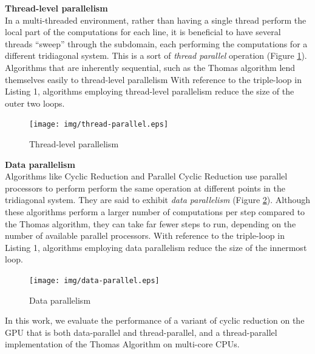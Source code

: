 \documentclass{article}
\begin{document}
    \pagebreak

    \textbf{Thread-level parallelism} \\
        In a multi-threaded environment,
        rather than having a single thread perform the local part
        of the computations for each line,
        it is beneficial to have several threads ``sweep'' through the subdomain,
        each performing the computations for a different tridiagonal system.
        This is a sort of \emph{thread parallel} operation (Figure \ref{fig:thread-parallel}).
        Algorithms that are inherently sequential,
        such as the Thomas algorithm lend themselves easily to thread-level parallelism
        With reference to the triple-loop in Listing 1,
        algorithms employing thread-level parallelism reduce the
        size of the outer two loops.

        \begin{figure}[h]
        \begin{center}
        \texttt{[image: img/thread-parallel.eps]}
        \end{center}
        \caption{Thread-level parallelism}
        \label{fig:thread-parallel}
        \end{figure}

    \textbf{Data parallelism} \\
        Algorithms like Cyclic Reduction and Parallel Cyclic Reduction
        use parallel processors to perform
        perform the same operation at different points in the tridiagonal system.
        They are said to exhibit \emph{data parallelism} (Figure \ref{fig:data-parallel}).
        Although these algorithms perform a larger number of computations
        per step compared to the Thomas algorithm,
        they can take far fewer steps to run,
        depending on the number of available parallel processors.
        With reference to the triple-loop in Listing 1,
        algorithms employing data parallelism reduce the size of the innermost loop.

        \begin{figure}[h]
        \begin{center}
        \texttt{[image: img/data-parallel.eps]}
        \end{center}
        \caption{Data parallelism}
        \label{fig:data-parallel}
        \end{figure}

    In this work, we evaluate the performance of a variant of cyclic reduction
    on the GPU that is both data-parallel and thread-parallel,
    and a thread-parallel implementation of the Thomas Algorithm on
    multi-core CPUs.
\end{document}
